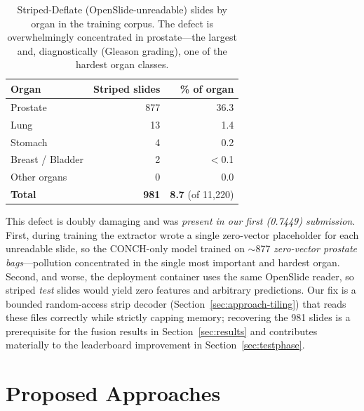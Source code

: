 \documentclass[11pt,a4paper]{article}
\begin{document}
\begin{table}[h]
\centering
\caption{Striped-Deflate (OpenSlide-unreadable) slides by organ in the training corpus. The defect
is overwhelmingly concentrated in prostate---the largest and, diagnostically (Gleason grading), one
of the hardest organ classes.}
\label{tab:striped}
\begin{tabular}{lrr}
\toprule
Organ & Striped slides & \% of organ \\
\midrule
Prostate        & 877 & 36.3 \\
Lung            & 13  & 1.4 \\
Stomach         & 4   & 0.2 \\
Breast / Bladder & 2   & $<$0.1 \\
Other organs    & 0   & 0.0 \\
\midrule
\textbf{Total}  & \textbf{981} & \textbf{8.7} (of 11{,}220) \\
\bottomrule
\end{tabular}
\end{table}

This defect is doubly damaging and was \emph{present in our first (0.7449) submission}. First,
during training the extractor wrote a single zero-vector placeholder for each unreadable slide, so
the CONCH-only model trained on $\sim$877 \emph{zero-vector prostate bags}---pollution
concentrated in the single most important and hardest organ. Second, and worse, the deployment
container uses the same OpenSlide reader, so striped \emph{test} slides would yield zero features
and arbitrary predictions. Our fix is a bounded random-access strip decoder
(Section~\ref{sec:approach-tiling}) that reads these files correctly while strictly capping
memory; recovering the 981 slides is a prerequisite for the fusion results in
Section~\ref{sec:results} and contributes materially to the leaderboard improvement in
Section~\ref{sec:testphase}.

\section{Proposed Approaches}
\label{sec:approach}
\end{document}
